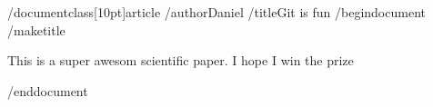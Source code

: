 /documentclass[10pt]{article}
/author{Daniel}
/title{Git is fun}
/begin{document}
		/maketitle
		
		This is a super awesom scientific paper.
		I hope I win the prize

/end{document}